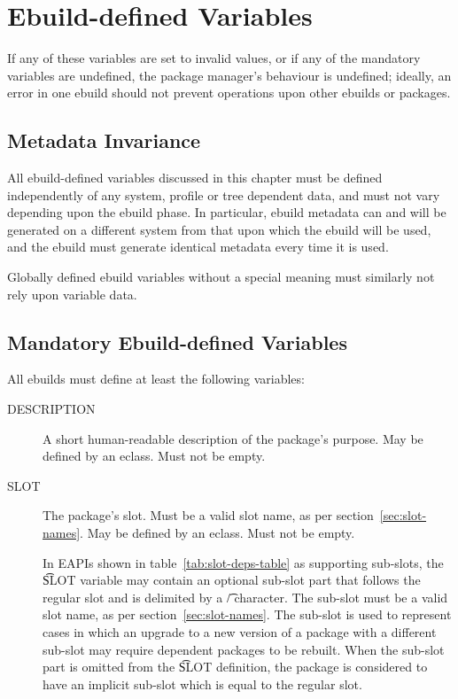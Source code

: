 \chapter{Ebuild-defined Variables}
\label{ch:ebuild-vars}


If any of these variables are set to invalid values, or if any of the mandatory variables are
undefined, the package manager's behaviour is undefined; ideally, an error in one ebuild should not
prevent operations upon other ebuilds or packages.

\section{Metadata Invariance}
\label{sec:metadata-invariance}

All ebuild-defined variables discussed in this chapter must be defined independently of
any system, profile or tree dependent data, and must not vary depending upon the ebuild
phase. In particular, ebuild metadata can and will be generated on a different system from that upon
which the ebuild will be used, and the ebuild must generate identical metadata every time it
is used.

Globally defined ebuild variables without a special meaning must similarly not rely upon
variable data.

\section{Mandatory Ebuild-defined Variables}
\label{sec:mandatory-vars}

All ebuilds must define at least the following variables:
\nobreakpar
\begin{description}
\item[DESCRIPTION] A short human-readable description of the package's purpose. May be defined by an
    eclass. Must not be empty.
\item[SLOT] The package's slot. Must be a valid slot name, as per section~\ref{sec:slot-names}.
    May be defined by an eclass. Must not be empty.

    In EAPIs shown in table~\ref{tab:slot-deps-table} as supporting sub-slots, the \t{SLOT} variable
    may contain an optional sub-slot part that follows the regular slot and is delimited by a \t{/}
    character. The sub-slot must be a valid slot name, as per section~\ref{sec:slot-names}.
    The sub-slot is used to represent cases in which an upgrade to a new version of a package with
    a different sub-slot may require dependent packages to be rebuilt. When the sub-slot part is
    omitted from the \t{SLOT} definition, the package is considered to have an implicit sub-slot
    which is equal to the regular slot.
\end{description}

